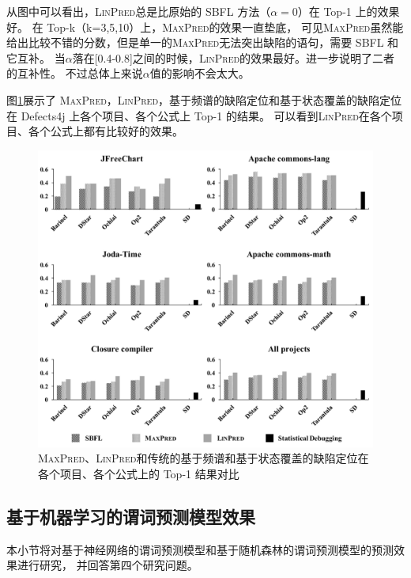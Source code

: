 从图中可以看出，\textsc{LinPred}总是比原始的 SBFL 方法（$\alpha = 0$）在 Top-1 上的效果好。
在 Top-k（k=3,5,10）上，\textsc{MaxPred}的效果一直垫底，
可见\textsc{MaxPred}虽然能给出比较不错的分数，但是单一的\textsc{MaxPred}无法突出缺陷的语句，需要 SBFL 和它互补。
当$\alpha$落在[0.4-0.8]之间的时候，\textsc{LinPred}的效果最好。进一步说明了二者的互补性。
不过总体上来说$\alpha$值的影响不会太大。


图\ref{fig:all-figure-method-level}展示了
\textsc{MaxPred}，\textsc{LinPred}，基于频谱的缺陷定位和基于状态覆盖的缺陷定位
在 Defects4j 上各个项目、各个公式上 Top-1 的结果。
可以看到\textsc{LinPred}在各个项目、各个公式上都有比较好的效果。

\begin{figure}[htbp] 
\centering 
\includegraphics[width=15cm]{figure/all-figure-method-level} 
\caption{\textsc{MaxPred}、\textsc{LinPred}和传统的基于频谱和基于状态覆盖的缺陷定位在各个项目、各个公式上的 Top-1 结果对比} 
\label{fig:all-figure-method-level}
\end{figure}

\subsection{基于机器学习的谓词预测模型效果}

本小节将对基于神经网络的谓词预测模型和基于随机森林的谓词预测模型的预测效果进行研究，
并回答第四个研究问题。

